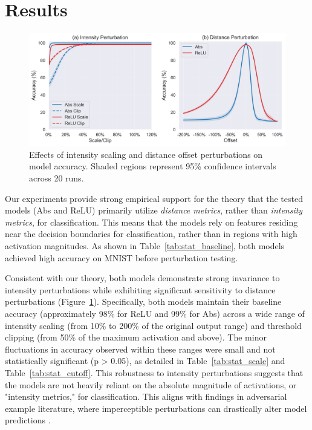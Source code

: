 \section{Results}

\begin{figure}[ht]
  \centering
  \includegraphics[width=\textwidth]{images/perturbation_analysis}
  \caption{Effects of intensity scaling and distance offset perturbations on model accuracy. Shaded regions represent 95\% confidence intervals across 20 runs.}
  \label{fig:perturbation_analysis}
\end{figure}

Our experiments provide strong empirical support for the theory that the tested models (Abs and ReLU) primarily utilize \textit{distance metrics}, rather than \textit{intensity metrics}, for classification. This means that the models rely on features residing near the decision boundaries for classification, rather than in regions with high activation magnitudes. As shown in Table~\ref{tab:stat_baseline}, both models achieved high accuracy on MNIST \citep{lecun1998gradient} before perturbation testing. 

Consistent with our theory, both models demonstrate strong invariance to intensity perturbations while exhibiting significant sensitivity to distance perturbations (Figure~\ref{fig:perturbation_analysis}). Specifically, both models maintain their baseline accuracy (approximately 98\% for ReLU and 99\% for Abs) across a wide range of intensity scaling (from 10\% to 200\% of the original output range) and threshold clipping (from 50\% of the maximum activation and above). The minor fluctuations in accuracy observed within these ranges were small and not statistically significant (p > 0.05), as detailed in Table~\ref{tab:stat_scale} and Table~\ref{tab:stat_cutoff}. This robustness to intensity perturbations suggests that the models are not heavily reliant on the absolute magnitude of activations, or "intensity metrics," for classification. This aligns with findings in adversarial example literature, where imperceptible perturbations can drastically alter model predictions \citep{szegedy2013intriguing, goodfellow2014explaining}.

